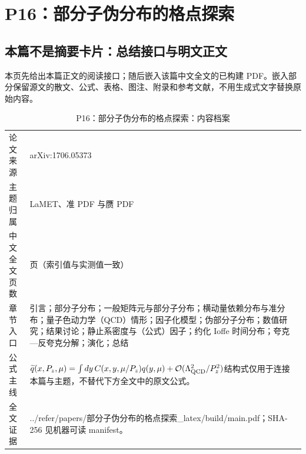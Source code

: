\documentclass[UTF8,11pt,oneside]{ctexbook}
\begin{document}
\chapter{P16：部分子伪分布的格点探索}
\section*{本篇不是摘要卡片：总结接口与明文正文}
本页先给出本篇正文的阅读接口；随后嵌入该篇中文全文的已构建 PDF。嵌入部分保留源文的散文、公式、表格、图注、附录和参考文献，不用生成式文字替换原始内容。
\begin{table}[htbp]
  \centering
  \caption{P16：部分子伪分布的格点探索：内容档案}
  \small
  \begin{tabularx}{0.96\textwidth}{@{}p{3.3cm}>{\raggedright\arraybackslash}X@{}}
    \toprule
    论文来源 & arXiv:1706.05373 \\
    主题归属 & LaMET、准 PDF 与赝 PDF \\
    中文全文页数 & 18 页（索引值与实测值一致） \\
    章节入口 & 引言；部分子分布；一般矩阵元与部分子分布；横动量依赖分布与准分布；量子色动力学（QCD）情形；因子化模型；伪部分子分布；数值研究；结果讨论；静止系密度与（公式）因子；约化 Ioffe 时间分布；夸克—反夸克分解；演化；总结 \\
    公式主线 & $\widetilde q(x,P_z,\mu)=\int dy\,C(x,y,\mu/P_z)q(y,\mu)+\mathcal O(\Lambda_{\rm QCD}^{2}/P_z^{2})$\newline\scriptsize 结构式仅用于连接本篇与主题，不替代下方全文中的原文公式。 \\
    全文证据 & ../\allowbreak{}refer/\allowbreak{}papers/\allowbreak{}部分子伪分布的格点探索\_\allowbreak{}latex/\allowbreak{}build/\allowbreak{}main.pdf；SHA-256 见机器可读 manifest。 \\
    \bottomrule
  \end{tabularx}
\end{table}
\end{document}
